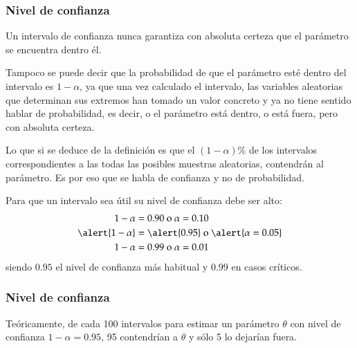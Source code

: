 \begin{frame}
\frametitle{Nivel de confianza}
Un intervalo de confianza nunca garantiza con absoluta certeza que el parámetro se encuentra dentro él.

Tampoco se puede decir que la probabilidad de que el parámetro esté dentro del intervalo es $1-\alpha$, ya que una vez calculado el intervalo, las variables aleatorias que determinan sus extremos han tomado un valor concreto y ya no tiene sentido hablar de probabilidad, es decir, o el parámetro está dentro, o está fuera, pero con absoluta certeza.

Lo que si se deduce de la definición es que el $(1-\alpha)\%$ de los intervalos correspondientes a las todas las posibles muestras aleatorias, contendrán al parámetro. Es por eso que se habla de \alert{confianza} y no de probabilidad.

Para que un intervalo sea útil su nivel de confianza debe ser alto:
\[
\begin{align*}
1-\alpha &= 0.90 \mbox{ o } \alpha=0.10\\
\alert{1-\alpha} &= \alert{0.95} \mbox{ o } \alert{\alpha=0.05}\\
1-\alpha &= 0.99 \mbox{ o } \alpha=0.01\\
\end{align*}
\]
siendo $0.95$ el nivel de confianza más habitual y $0.99$ en casos críticos.
\end{frame}


\begin{frame}
\frametitle{Nivel de confianza}
Teóricamente, de cada 100 intervalos para estimar un parámetro $\theta$ con nivel de confianza $1-\alpha=0.95$, 95 contendrían a $\theta$ y sólo 5 lo dejarían fuera.
\begin{center}
\scalebox{0.7}{}
\end{center}
\end{frame}



